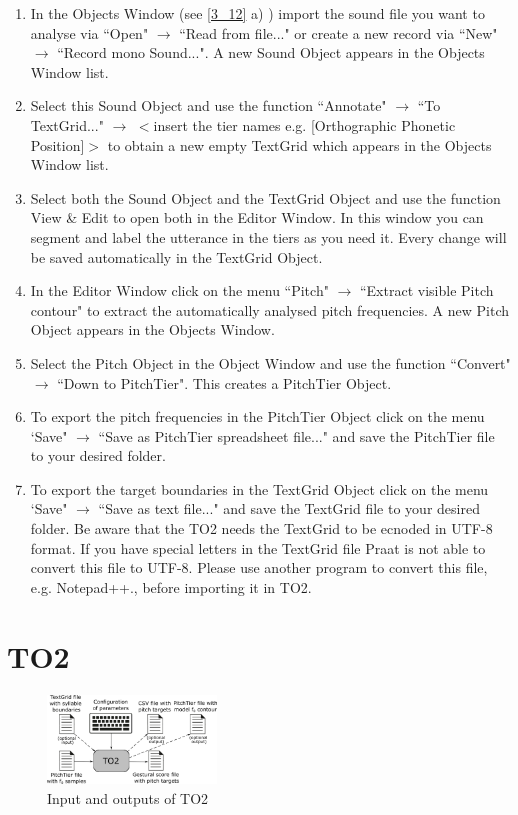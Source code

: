 \begin{enumerate}
	\item In the Objects Window (see \autoref{3_12} a) ) import the sound file you want to analyse via ``Open" $\to$ ``Read from file..." or create a new record via ``New" $\to$ ``Record mono Sound...". A new Sound Object appears in the Objects Window list. 
	\item Select this Sound Object and use the function ``Annotate" $\to$ ``To TextGrid..." $\to$ $<$insert the tier names e.g. [Orthographic Phonetic Position]$>$ to obtain a new empty TextGrid which appears in the Objects Window list.
	\item Select both the Sound Object and the TextGrid Object and use the function View \& Edit to open both in the Editor Window. In this window you can segment and label the utterance in the tiers as you need it. Every change will be saved automatically in the TextGrid Object.
	\item In the Editor Window click on the menu ``Pitch" $\to$ ``Extract visible Pitch contour" to extract the automatically analysed pitch frequencies. A new Pitch Object appears in the Objects Window.
	\item Select the Pitch Object in the Object Window and use the function ``Convert" $\to$ ``Down to PitchTier". This creates a PitchTier Object. 
	\item To export the pitch frequencies in the PitchTier Object click on the menu `Save" $\to$ ``Save as PitchTier spreadsheet file..." and save the PitchTier file to your desired folder. 
	\item To export the target boundaries in the TextGrid Object click on the menu `Save" $\to$ ``Save as text file..." and save the TextGrid file to your desired folder. Be aware that the TO2 needs the TextGrid to be ecnoded in UTF-8 format. If you have special letters in the TextGrid file Praat is not able to convert this file to UTF-8. Please use another program to convert this file, e.g. Notepad++., before importing it in TO2.
\end{enumerate}

\section{TO2}

\begin{figure}[H]
\centering
\includegraphics[width=0.4\textwidth]{images/3_21.png}
\caption{Input and outputs of TO2}
\label{3_21}
\end{figure}


